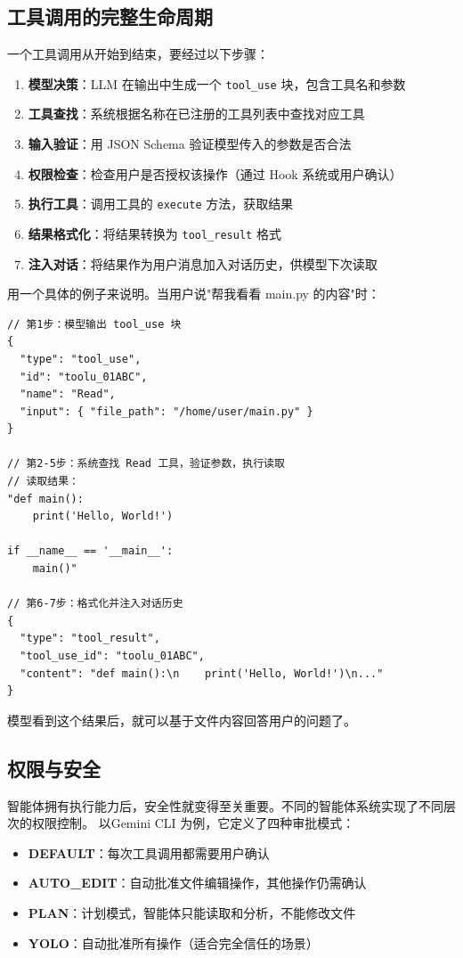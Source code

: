 \subsection{工具调用的完整生命周期}

一个工具调用从开始到结束，要经过以下步骤：

\begin{enumerate}
	\item \textbf{模型决策}：LLM 在输出中生成一个 \texttt{tool\_use} 块，包含工具名和参数
	\item \textbf{工具查找}：系统根据名称在已注册的工具列表中查找对应工具
	\item \textbf{输入验证}：用 JSON Schema 验证模型传入的参数是否合法
	\item \textbf{权限检查}：检查用户是否授权该操作（通过 Hook 系统或用户确认）
	\item \textbf{执行工具}：调用工具的 \texttt{execute} 方法，获取结果
	\item \textbf{结果格式化}：将结果转换为 \texttt{tool\_result} 格式
	\item \textbf{注入对话}：将结果作为用户消息加入对话历史，供模型下次读取
\end{enumerate}

用一个具体的例子来说明。当用户说"帮我看看 main.py 的内容"时：

\begin{verbatim}
// 第1步：模型输出 tool_use 块
{
  "type": "tool_use",
  "id": "toolu_01ABC",
  "name": "Read",
  "input": { "file_path": "/home/user/main.py" }
}

// 第2-5步：系统查找 Read 工具，验证参数，执行读取
// 读取结果：
"def main():
    print('Hello, World!')

if __name__ == '__main__':
    main()"

// 第6-7步：格式化并注入对话历史
{
  "type": "tool_result",
  "tool_use_id": "toolu_01ABC",
  "content": "def main():\n    print('Hello, World!')\n..."
}
\end{verbatim}

模型看到这个结果后，就可以基于文件内容回答用户的问题了。

\subsection{权限与安全}
智能体拥有执行能力后，安全性就变得至关重要。不同的智能体系统实现了不同层次的权限控制。
以Gemini CLI 为例，它定义了四种审批模式：

\begin{itemize}
	\item \textbf{DEFAULT}：每次工具调用都需要用户确认
	\item \textbf{AUTO\_EDIT}：自动批准文件编辑操作，其他操作仍需确认
	\item \textbf{PLAN}：计划模式，智能体只能读取和分析，不能修改文件
	\item \textbf{YOLO}：自动批准所有操作（适合完全信任的场景）
\end{itemize}

